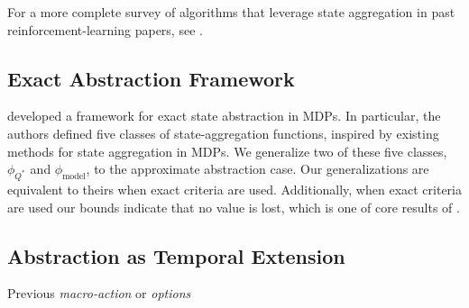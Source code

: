 For a more complete survey of algorithms that leverage state aggregation in past reinforcement-learning papers, see \citet{li2006towards}.

\subsection{Exact Abstraction Framework}

\citet{li2006towards} developed a framework for exact state abstraction in \acp{MDP}. In particular, the authors defined five classes of state-aggregation functions, inspired by existing methods for state aggregation in \acp{MDP}. We generalize two of these five classes, $\phi_{Q^*}$ and $\phi_{\text{model}}$, to the approximate abstraction case. Our generalizations are equivalent to theirs when exact criteria are used. Additionally, when exact criteria are used our bounds indicate that no value is lost, which is one of core results of \citet{li2006towards}.


\subsection{Abstraction as Temporal Extension}
Previous \textit{macro-action} or \textit{options}
